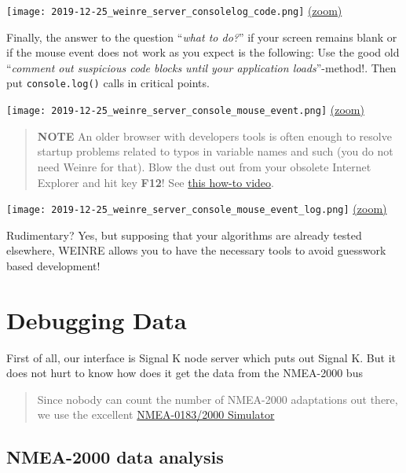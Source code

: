 \documentclass[11pt]{article}
\begin{document}
    \texttt{[image: 2019-12-25\_weinre\_server\_consolelog\_code.png]}
\href{img/2019-12-25_weinre_server_consolelog_code.png}{(zoom)}

    Finally, the answer to the question ``\emph{what to do?}'' if your
screen remains blank or if the mouse event does not work as you expect
is the following: Use the good old ``\emph{comment out suspicious code
blocks until your application loads}''-method!. Then put
\texttt{console.log()} calls in critical points.

    \texttt{[image: 2019-12-25\_weinre\_server\_console\_mouse\_event.png]}
\href{img/2019-12-25_weinre_server_console_mouse_event.png}{(zoom)}

    \begin{quote}
\textbf{NOTE} An older browser with developers tools is often enough to
resolve startup problems related to typos in variable names and such
(you do not need Weinre for that). Blow the dust out from your obsolete
Internet Explorer and hit key \textbf{F12}! See
\href{https://vimeo.com/396195423}{this how-to video}.
\end{quote}

    \texttt{[image: 2019-12-25\_weinre\_server\_console\_mouse\_event\_log.png]}
\href{img/2019-12-25_weinre_server_console_mouse_event_log.png}{(zoom)}

    Rudimentary? Yes, but supposing that your algorithms are already tested
elsewhere, WEINRE allows you to have the necessary tools to avoid
guesswork based development!

    \hypertarget{debugging-data}{%
\section{Debugging Data}\label{debugging-data}}

    First of all, our interface is Signal K node server which puts out
Signal K. But it does not hurt to know how does it get the data from the
NMEA-2000 bus

    \begin{quote}
Since nobody can count the number of NMEA-2000 adaptations out there, we
use the excellent
\href{https://opencpn.org/wiki/dokuwiki/doku.php?id=opencpn:supplementary_software:signalk:a6\#how_to_use_a_nmea-simulator_to_stream_nmea-0183_and_nmea-2000_data}{NMEA-0183/2000
Simulator}
\end{quote}

    \hypertarget{nmea-2000-data-analysis}{%
\subsection{NMEA-2000 data analysis}\label{nmea-2000-data-analysis}}
\end{document}
